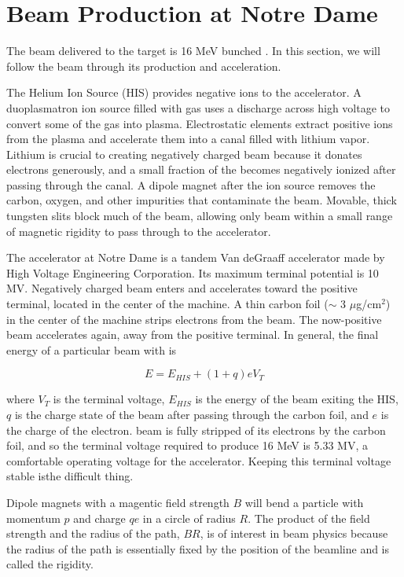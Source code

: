 \section{Beam Production at Notre Dame}
The beam delivered to the target is 16 MeV bunched .  In this section, we will follow the beam through its production and acceleration.

The Helium Ion Source (HIS) provides negative  ions to the accelerator.  A duoplasmatron ion source filled with  gas uses a discharge across high voltage to convert some of the gas into plasma.  Electrostatic elements extract positive  ions from the plasma and accelerate them into a canal filled with lithium vapor.  Lithium is crucial to creating negatively charged beam because it donates electrons generously, and a small fraction of the  becomes negatively ionized after passing through the canal.  A dipole magnet after the ion source removes the carbon, oxygen, and other impurities that contaminate the  beam.  Movable, thick tungsten slits block much of the beam, allowing only beam within a small range of magnetic rigidity to pass through to the accelerator.

The accelerator at Notre Dame is a tandem Van deGraaff accelerator made by High Voltage Engineering Corporation.  Its maximum terminal potential is 10 MV.  Negatively charged beam enters and accelerates toward the positive terminal, located in the center of the machine. A thin carbon foil ($\sim$ 3 $\mu$g/cm$^2$) in the center of the machine strips electrons from the beam.  The now-positive beam accelerates again, away from the positive terminal. In general, the final energy of a particular beam with is 

\begin{equation}
E = E_{HIS} + (1+q)eV_T
\end{equation}

where $V_T$ is the terminal voltage, $E_{HIS}$ is the energy of the beam exiting the HIS, $q$ is the charge state of the beam after passing through the carbon foil, and $e$ is the charge of the electron.   beam is fully stripped of its electrons by the carbon foil, and so the terminal voltage required to produce 16 MeV  is 5.33 MV, a comfortable operating voltage for the accelerator.  Keeping this terminal voltage stable isthe difficult thing.  

Dipole magnets with a magentic field strength $B$ will bend a particle with momentum $p$ and charge $qe$ in a circle of radius $R$.  The product of the field strength and the radius of the path, $BR$, is of interest in beam physics because the radius of the path is essentially fixed by the position of the beamline and is called the rigidity.

